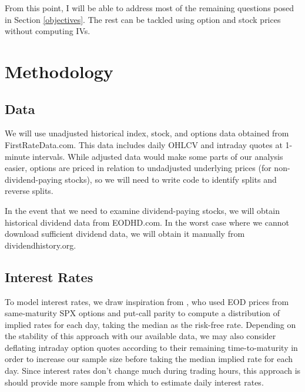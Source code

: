 \documentclass[final,3p,times,authoryear]{elsarticle}
\begin{document}
  From this point, I will be able to address most of the remaining questions posed in Section \ref{objectives}. The rest can be tackled using option and stock prices without computing IVs.

\section{Methodology}
  \label{methodology}
  
  \subsection{Data}
    We will use unadjusted historical index, stock, and options data obtained from FirstRateData.com. This data includes daily OHLCV and intraday quotes at 1-minute intervals. While adjusted data would make some parts of our analysis easier, options are priced in relation to undadjusted underlying prices (for non-dividend-paying stocks), so we will need to write code to identify splits and reverse splits. 
    
    In the event that we need to examine dividend-paying stocks, we will obtain historical dividend data from EODHD.com. In the worst case where we cannot download sufficient dividend data, we will obtain it manually from dividendhistory.org.

  \subsection{Interest Rates}
    To model interest rates, we draw inspiration from \citet{jackwerth_recovering_2000}, who used EOD prices from same-maturity SPX options and put-call parity to compute a distribution of implied rates for each day, taking the median as the risk-free rate. Depending on the stability of this approach with our available data, we may also consider deflating intraday option quotes according to their remaining time-to-maturity in order to increase our sample size before taking the median implied rate for each day. Since interest rates don't change much during trading hours, this approach is should provide more sample from which to estimate daily interest rates.
\end{document}
